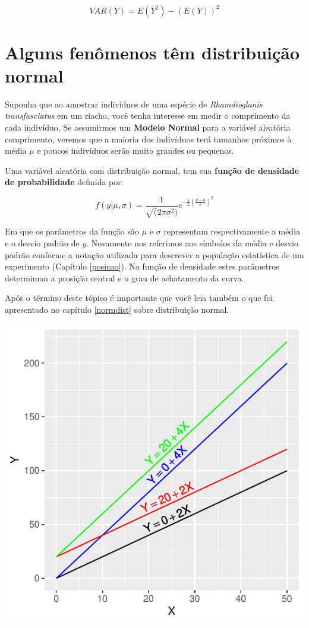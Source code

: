 \documentclass[
]{book}
\begin{document}
\[VAR(Y) = E(Y^2) - (E(Y))^2\]

\hypertarget{alguns-fenuxf4menos-tuxeam-distribuiuxe7uxe3o-normal}{%
\section{Alguns fenômenos têm distribuição normal}\label{alguns-fenuxf4menos-tuxeam-distribuiuxe7uxe3o-normal}}

Suponha que ao amostrar indivíduos de uma espécie de \emph{Rhamdioglanis transfasciatus} em um riacho, você tenha interesse em medir o comprimento da cada indivíduo. Se assumirmos um \textbf{Modelo Normal} para a variável aleatória comprimento, veremos que a maioria dos indivíduos terá tamanhos próximos à média \(\mu\) e poucos indivíduos serão muito grandes ou pequenos.

Uma variável aleatória com distribuição normal, tem sua \textbf{função de densidade de probabilidade} definida por:

\[f(y|\mu,\sigma) = \frac{1}{\sqrt(2\pi\sigma^2)}e^{-\frac{1}{2}(\frac{y-\mu}{\sigma})^2}\]

Em que os parâmetros da função são \(\mu\) e \(\sigma\) representam respectivamente a média e o desvio padrão de \(y\). Novamente nos referimos aos símbolos da média e desvio padrão conforme a notação utilizada para descrever a população estatística de um experimento (Capítulo \ref{posicao}). Na função de densidade estes parâmetros determiman a prosição central e o grau de achatamento da curva.

Após o término deste tópico é importante que você leia também o que foi apresentado no capítulo \ref{normdist} sobre distribuição normal.

\begin{center}\includegraphics{probest-cambientais_files/figure-latex/unnamed-chunk-212-1} \end{center}
\end{document}

